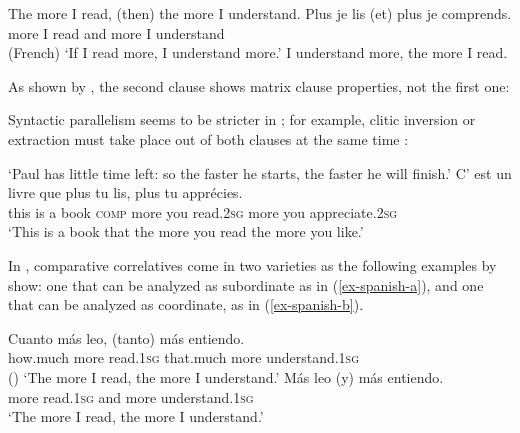 \eal
\label{adjcc}
\ex The more I read, (then) the more I understand.
\ex 
\gll Plus je lis (et) plus je comprends.\\
     more I read \hphantom{(}and more I understand\\\hfill(French)
\glt `If I read more, I understand more.'
\ex I understand more, the more I read.
\zl


As shown by \citet[549--550]{culijack}, the second clause shows matrix clause properties, not the first one:

\eal
{}
\zl

Syntactic parallelism seems to be stricter in ; for example, clitic inversion or extraction
must take place out of both clauses at the same time \citep[]{Abeille:Borsley:08}:

\eal
\ex 
{}
\glt `Paul has little time left: so the faster he starts, the faster he will finish.'
\ex 
\gll C'   est un livre  que      plus   tu    lis, plus  tu    appr\'{e}cies. \\
     this is    a  book \textsc{comp} more you read.2\textsc{sg}  more you appreciate.2\textsc{sg} \\
\glt `This is a book that the more you read the more you like.'
\zl

In , comparative correlatives come in two varieties as the following examples by \citet[]{Abeille:Borsley:Espinal:06} show: one that can be analyzed as subordinate as in (\ref{ex-spanish-a}), and one that can be analyzed as coordinate, as in (\ref{ex-spanish-b}).

\eal
\label{spanishab}
\ex 
\label{ex-spanish-a}
\gll Cuanto   m\'{a}s leo,     (tanto)        m\'{a}s entiendo. \\
     how.much more    read.1\textsc{sg} \hphantom{(}that.much more understand.1\textsc{sg} \\\hfill{()}
\glt `The more I read, the more I understand.'
\ex 
\label{ex-spanish-b}
\gll	M\'{a}s leo        (y) m\'{a}s entiendo.\\
	more read.1\textsc{sg} \hphantom{(}and more understand.1\textsc{sg} \\
\glt `The more I read, the more I understand.'\\ 
\zl

